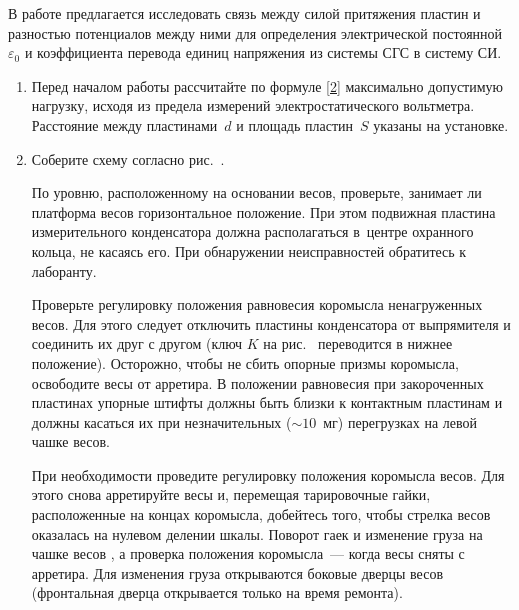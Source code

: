 \begin{lab:task}
	
	В работе предлагается исследовать связь между силой  притяжения пластин и разностью потенциалов между ними для
	определения электрической постоянной $\varepsilon_0$ и коэффициента перевода единиц напряжения из системы СГС в систему СИ.
	
	
	\begin{enumerate}
		\item Перед началом работы рассчитайте по формуле \eqref{2} максимально допустимую нагрузку, исходя из предела измерений
		электростатического вольтметра. Расстояние между пластинами~$d$ и площадь пластин~$S$ указаны на установке.
		
		\item Соберите схему согласно рис.~.
		
		По уровню, расположенному на основании весов, проверьте, занимает ли платформа весов горизонтальное положение. При этом
		подвижная пластина измерительного конденсатора должна располагаться в~центре охранного кольца, не касаясь его. При
		обнаружении неисправностей обратитесь к лаборанту.
		
		Проверьте регулировку положения равновесия коромысла ненагруженных весов. Для этого следует отключить пластины
		конденсатора от выпрямителя и соединить их друг с другом (ключ $K$ на рис.~ переводится в нижнее положение). Осторожно,
		чтобы не сбить опорные призмы коромысла, освободите весы от арретира. В положении равновесия при закороченных пластинах
		упорные штифты должны быть близки к контактным пластинам и должны касаться их при незначительных ($\sim 10$~мг)
		перегрузках на левой чашке весов.
		
		При необходимости проведите регулировку положения коромысла весов. Для этого снова арретируйте весы и, перемещая
		тарировочные гайки, расположенные на концах коромысла, добейтесь того, чтобы стрелка весов оказалась на нулевом делении
		шкалы. Поворот гаек и изменение груза на чашке весов , а проверка
		положения коромысла~--- когда весы сняты с арретира. Для изменения груза открываются боковые дверцы весов (фронтальная
		дверца открывается только на время ремонта).
		

\end{enumerate}
\end{lab:task}
